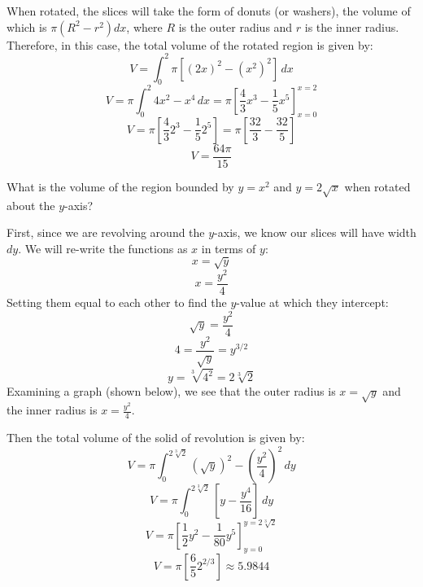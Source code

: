 When rotated, the slices will take the form of donuts (or washers), the volume 
of which is $\pi \left( R^2 - r^2 \right) dx$, where $R$ is the outer radius 
and $r$ is the inner radius. Therefore, in this case, the total volume of the 
rotated region is given by:
$$V = \int_0^2 \pi \left[ \left( 2x \right)^2 - \left(x^2 \right)^2 \right]\,
dx$$
$$V = \pi \int_0^2 4x^2 - x^4\,dx = \pi \left[\frac{4}{3}x^3 - \frac{1}{5}x^5 
\right]_{x = 0}^{x = 2}$$
$$V = \pi \left[\frac{4}{3}2^3 - \frac{1}{5}2^5 \right] = \pi \left[ \frac{32}{
3} - \frac{32}{5} \right] $$
$$V = \frac{64 \pi}{15} $$

\begin{Exercise}[label = volume2]
What is the volume of the region bounded by $y = x^2$ and $y = 2\sqrt{x}$ when 
rotated about the $y$-axis? 
\end{Exercise}

\begin{Answer}[ref = volume 2]
First, since we are revolving around the $y$-axis, we know our slices will 
have width $dy$. We will re-write the functions as $x$ in terms of $y$:
$$x = \sqrt{y}$$
$$x = \frac{y^2}{4}$$
Setting them equal to each other to find the $y$-value at which they intercept:
$$\sqrt{y} = \frac{y^2}{4}$$
$$4 = \frac{y^2}{\sqrt{y}} = y^{3/2}$$
$$y = \sqrt[3]{4^2} = 2\sqrt[3]{2}$$
Examining a graph (shown below), we see that the outer radius is $x = \sqrt{y}$
and the inner radius is $x = \frac{y^2}{4}$. 


Then the total volume of the solid of revolution is given by:
$$V = \pi \int_0^{2\sqrt[3]{2}} \left(\sqrt{y} \right)^2 - \left( \frac{y^2}{4} 
\right)^2\,dy$$
$$V = \pi \int_0^{2\sqrt[3]{2}} \left[ y - \frac{y^4}{16} \right]\,dy$$
$$V = \pi \left[ \frac{1}{2}y^2 - \frac{1}{80}y^5 \right]_{y = 0}^{y = 
2\sqrt[3]{2}}$$
$$V = \pi \left[ \frac{6}{5} 2^{2/3} \right] \approx 5.9844$$
\end{Answer}

